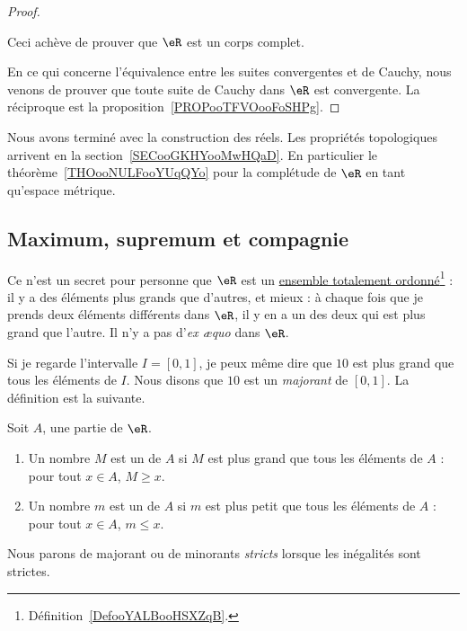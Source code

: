 \begin{proof}
\begin{subproof}
        Ceci achève de prouver que \( \eR\) est un corps complet.
        \end{subproof}

        En ce qui concerne l'équivalence entre les suites convergentes et de Cauchy, nous venons de prouver que toute suite de Cauchy dans \( \eR\) est convergente. La réciproque est la proposition~\ref{PROPooTFVOooFoSHPg}.

\end{proof}

Nous avons terminé avec la construction des réels. Les propriétés topologiques arrivent en la section~\ref{SECooGKHYooMwHQaD}. En particulier le théorème~\ref{THOooNULFooYUqQYo} pour la complétude de \( \eR\) en tant qu'espace métrique.

\subsection{Maximum, supremum et compagnie}

Ce n'est un secret pour personne que $\eR$ est un \href{http://fr.wikipedia.org/wiki/Relation_d'ordre}{ensemble totalement ordonné}\footnote{Définition~\ref{DefooYALBooHSXZqB}.} : il y a des éléments plus grands que d'autres, et mieux : à chaque fois que je prends deux éléments différents dans $\eR$, il y en a un des deux qui est plus grand que l'autre. Il n'y a pas d'\emph{ex æquo} dans $\eR$.

  Si je regarde l'intervalle $I=[0,1]$, je peux même dire que $10$ est plus grand que tous les éléments de $I$. Nous disons que $10$ est un \emph{majorant} de $[0,1]$. La définition est la suivante.
\begin{definition}
    Soit \( A\), une partie de \( \eR\). 
    \begin{enumerate}
        \item
            Un nombre \( M\) est un  de \( A\) si \( M\) est plus grand que tous les éléments de \( A\) : pour tout \( x\in A\), \( M\geq x\).
        \item
            Un nombre \( m\) est un  de \( A\) si \( m\) est plus petit que tous les éléments de \( A\) : pour tout \( x\in A\), \( m\leq x\).
    \end{enumerate}
    Nous parons de majorant ou de minorants \emph{stricts} lorsque les inégalités sont strictes.
\end{definition}

